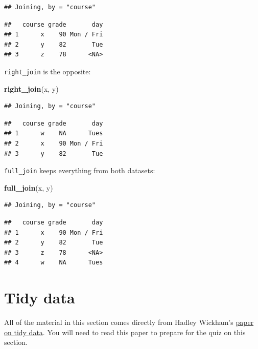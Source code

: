 \documentclass[]{book}
\makeatletter
\newenvironment{Shaded}{\begin{snugshade}}{\end{snugshade}}
\newcommand{\KeywordTok}[1]{\textcolor[rgb]{0.13,0.29,0.53}{\textbf{#1}}}
\newcommand{\NormalTok}[1]{#1}
\newenvironment{kframe}{%
\medskip{}
\setlength{\fboxsep}{.8em}
 \def\at@end@of@kframe{}%
 \ifinner\ifhmode%
  \def\at@end@of@kframe{\end{minipage}}%
  \begin{minipage}{\columnwidth}%
 \fi\fi%
 \def\FrameCommand##1{\hskip\@totalleftmargin \hskip-\fboxsep
 \colorbox{shadecolor}{##1}\hskip-\fboxsep
     \hskip-\linewidth \hskip-\@totalleftmargin \hskip\columnwidth}%
 \MakeFramed {\advance\hsize-\width
   \@totalleftmargin\z@ \linewidth\hsize
   \@setminipage}}%
 {\par\unskip\endMakeFramed%
 \at@end@of@kframe}
\renewenvironment{Shaded}{\begin{kframe}}{\end{kframe}}
\theoremstyle{definition}
\theoremstyle{definition}
\theoremstyle{definition}
\theoremstyle{remark}
\makeatother
\begin{document}
\begin{verbatim}
## Joining, by = "course"
\end{verbatim}

\begin{verbatim}
##   course grade       day
## 1      x    90 Mon / Fri
## 2      y    82       Tue
## 3      z    78      <NA>
\end{verbatim}

\texttt{right\_join} is the opposite:

\begin{Shaded}
\begin{Highlighting}[]
\KeywordTok{right_join}\NormalTok{(x, y)}
\end{Highlighting}
\end{Shaded}

\begin{verbatim}
## Joining, by = "course"
\end{verbatim}

\begin{verbatim}
##   course grade       day
## 1      w    NA      Tues
## 2      x    90 Mon / Fri
## 3      y    82       Tue
\end{verbatim}

\texttt{full\_join} keeps everything from both datasets:

\begin{Shaded}
\begin{Highlighting}[]
\KeywordTok{full_join}\NormalTok{(x, y)}
\end{Highlighting}
\end{Shaded}

\begin{verbatim}
## Joining, by = "course"
\end{verbatim}

\begin{verbatim}
##   course grade       day
## 1      x    90 Mon / Fri
## 2      y    82       Tue
## 3      z    78      <NA>
## 4      w    NA      Tues
\end{verbatim}

\section{Tidy data}\label{tidy-data}

All of the material in this section comes directly from Hadley Wickham's
\href{http://vita.had.co.nz/papers/tidy-data.pdf}{paper on tidy data}.
You will need to read this paper to prepare for the quiz on this
section.
\end{document}
